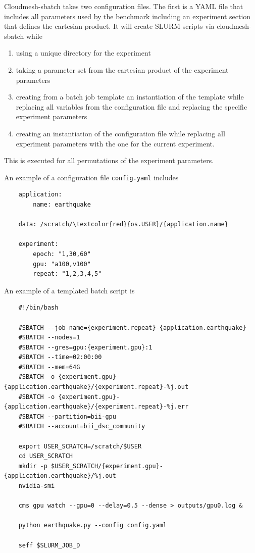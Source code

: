 \documentclass[utf8]{FrontiersinVancouver} %
\begin{document}
Cloudmesh-sbatch takes two configuration files. The first is a YAML
file that includes all parameters used by the benchmark including an
experiment section that defines the cartesian product. It will 
create SLURM scripts via cloudmesh-sbatch while

\begin{enumerate}
  \item using a unique directory for the experiment
  \item taking a parameter set from the cartesian product
    of the experiment parameters
  \item creating from a batch job template an instantiation of the
    template while replacing all variables from the configuration file
    and replacing the specific experiment parameters
  \item creating an instantiation of the configuration file while replacing all experiment parameters with the one for the current experiment.
\end{enumerate}

This is executed for all permutations of the experiment parameters.

An example of a configuration file \verb|config.yaml| includes

{\footnotesize
\begin{Verbatim}
    application:
        name: earthquake

    data: /scratch/\textcolor{red}{os.USER}/{application.name}
       
    experiment:
        epoch: "1,30,60"
        gpu: "a100,v100"
        repeat: "1,2,3,4,5"
\end{Verbatim}
}

An example of a templated batch script is

{\footnotesize
\begin{Verbatim}
    #!/bin/bash

    #SBATCH --job-name={experiment.repeat}-{application.earthquake}
    #SBATCH --nodes=1
    #SBATCH --gres=gpu:{experiment.gpu}:1
    #SBATCH --time=02:00:00
    #SBATCH --mem=64G
    #SBATCH -o {experiment.gpu}-{application.earthquake}/{experiment.repeat}-%j.out
    #SBATCH -o {experiment.gpu}-{application.earthquake}/{experiment.repeat}-%j.err
    #SBATCH --partition=bii-gpu
    #SBATCH --account=bii_dsc_community

    export USER_SCRATCH=/scratch/$USER
    cd USER_SCRATCH
    mkdir -p $USER_SCRATCH/{experiment.gpu}-{application.earthquake}/%j.out
    nvidia-smi

    cms gpu watch --gpu=0 --delay=0.5 --dense > outputs/gpu0.log &

    python earthquake.py --config config.yaml

    seff $SLURM_JOB_D
\end{Verbatim}
}
\end{document}
